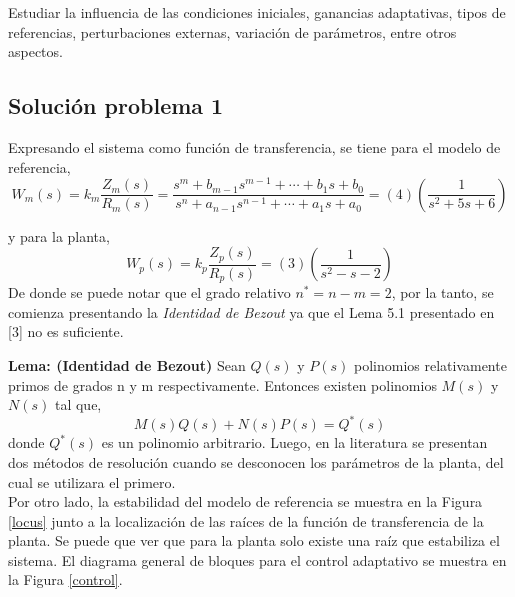 \documentclass[letterpaper,11pt]{article} %
\begin{document}
Estudiar la influencia de las condiciones iniciales, ganancias adaptativas, tipos de referencias, perturbaciones externas, variación de parámetros, entre otros aspectos.

\subsection{Solución problema 1}
Expresando el sistema como función de transferencia, se tiene para el modelo de referencia,
\begin{equation}
W_m(s) = k_m \frac{Z_m(s)}{R_m(s)} = \frac{s^m + b_{m-1} s^{m-1} + \cdots + b_1 s + b_0}{s^n + a_{n-1} s^{n-1} + \cdots + a_1 s + a_0} = (4) \left(\frac{1}{s^2 + 5s + 6} \right)
\end{equation}

y para la planta,
\begin{equation}
W_p(s) = k_p \frac{Z_p(s)}{R_p(s)} = (3) \left(\frac{1}{s^2 - s - 2} \right)
\end{equation}
De donde se puede notar que el grado relativo $n^* = n - m =2$, por la tanto, se comienza presentando la \textit{Identidad de Bezout} ya que el Lema 5.1 presentado en [3] no es suficiente.

\textbf{Lema: (Identidad de Bezout)}
Sean $Q(s)$ y $P(s)$ polinomios relativamente primos de grados n y m respectivamente. Entonces existen polinomios $M(s)$ y $N(s)$ tal que,
\begin{equation}
	M(s)Q(s) + N(s)P(s) = Q^*(s)
	\label{QQ}
\end{equation}
donde $Q^*(s)$ es un polinomio arbitrario. Luego, en la literatura se presentan dos métodos de resolución cuando se desconocen los parámetros de la planta, del cual se utilizara el primero.\\

Por otro lado, la estabilidad del modelo de referencia se muestra en la Figura \ref{locus} junto a la localización de las raíces de la función de transferencia de la planta. Se puede que ver que para la planta solo existe una raíz que estabiliza el sistema. El diagrama general de bloques para el control adaptativo se muestra en la Figura \ref{control}.
\end{document}
